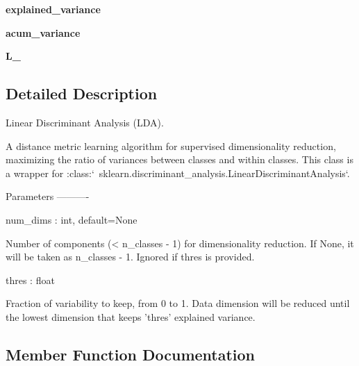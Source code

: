 \begin{DoxyCompactItemize}
\item 
{\bfseries explained\+\_\+variance}\hypertarget{classdml_1_1lda_1_1LDA_a4848f91c654e62673865495473b93bb9}{}\label{classdml_1_1lda_1_1LDA_a4848f91c654e62673865495473b93bb9}

\item 
{\bfseries acum\+\_\+variance}\hypertarget{classdml_1_1lda_1_1LDA_aaf62c7f8712f45f2d981a8acdcf473eb}{}\label{classdml_1_1lda_1_1LDA_aaf62c7f8712f45f2d981a8acdcf473eb}

\item 
{\bfseries L\+\_\+}\hypertarget{classdml_1_1lda_1_1LDA_ad5c23356042d60aea6ce93a4397fd2ed}{}\label{classdml_1_1lda_1_1LDA_ad5c23356042d60aea6ce93a4397fd2ed}

\end{DoxyCompactItemize}


\subsection{Detailed Description}
\begin{DoxyVerb}Linear Discriminant Analysis (LDA).

A distance metric learning algorithm for supervised dimensionality reduction, maximizing the ratio of variances between classes and within classes.
This class is a wrapper for :class:`~sklearn.discriminant_analysis.LinearDiscriminantAnalysis`.

Parameters
----------

num_dims : int, default=None

    Number of components (< n_classes - 1) for dimensionality reduction. If None, it will be taken as n_classes - 1. Ignored if thres is provided.

thres : float

    Fraction of variability to keep, from 0 to 1. Data dimension will be reduced until the lowest dimension that keeps 'thres' explained variance.
\end{DoxyVerb}
 

\subsection{Member Function Documentation}
